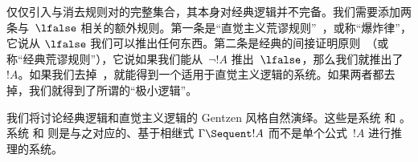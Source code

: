 \documentclass[../../../include/open-logic-section]{subfiles}
\begin{document}
仅仅引入与消去规则对的完整集合，其本身对经典逻辑并不完备。我们需要添加两条与~$\lfalse$ 相关的额外规则。第一条是“直觉主义荒谬规则”~\FalseInt，或称“爆炸律”，它说从 $\lfalse$ 我们可以推出任何东西。第二条是经典的间接证明原则~\FalseCl{}（或称“经典荒谬规则”），它说如果我们能从~$\lnot !A$ 推出~$\lfalse$，那么我们就推出了~$!A$。如果我们去掉~\FalseCl，就能得到一个适用于直觉主义逻辑的系统。如果两者都去掉，我们就得到了所谓的“极小逻辑”。

我们将讨论经典逻辑和直觉主义逻辑的 Gentzen 风格自然演绎。这些是系统  和 。系统  和  则是与之对应的、基于相继式 $\Gamma \Sequent !A$ 而不是单个公式~$!A$ 进行推理的系统。
\end{document}
